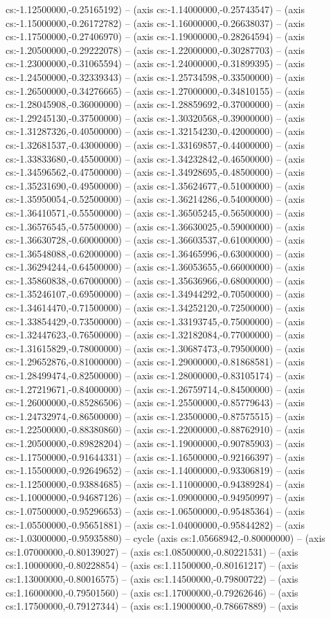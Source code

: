 cs:-1.12500000,-0.25165192) -- (axis cs:-1.14000000,-0.25743547) -- (axis cs:-1.15000000,-0.26172782) -- (axis cs:-1.16000000,-0.26638037) -- (axis cs:-1.17500000,-0.27406970) -- (axis cs:-1.19000000,-0.28264594) -- (axis cs:-1.20500000,-0.29222078) -- (axis cs:-1.22000000,-0.30287703) -- (axis cs:-1.23000000,-0.31065594) -- (axis cs:-1.24000000,-0.31899395) -- (axis cs:-1.24500000,-0.32339343) -- (axis cs:-1.25734598,-0.33500000) -- (axis cs:-1.26500000,-0.34276665) -- (axis cs:-1.27000000,-0.34810155) -- (axis cs:-1.28045908,-0.36000000) -- (axis cs:-1.28859692,-0.37000000) -- (axis cs:-1.29245130,-0.37500000) -- (axis cs:-1.30320568,-0.39000000) -- (axis cs:-1.31287326,-0.40500000) -- (axis cs:-1.32154230,-0.42000000) -- (axis cs:-1.32681537,-0.43000000) -- (axis cs:-1.33169857,-0.44000000) -- (axis cs:-1.33833680,-0.45500000) -- (axis cs:-1.34232842,-0.46500000) -- (axis cs:-1.34596562,-0.47500000) -- (axis cs:-1.34928695,-0.48500000) -- (axis cs:-1.35231690,-0.49500000) -- (axis cs:-1.35624677,-0.51000000) -- (axis cs:-1.35950054,-0.52500000) -- (axis cs:-1.36214286,-0.54000000) -- (axis cs:-1.36410571,-0.55500000) -- (axis cs:-1.36505245,-0.56500000) -- (axis cs:-1.36576545,-0.57500000) -- (axis cs:-1.36630025,-0.59000000) -- (axis cs:-1.36630728,-0.60000000) -- (axis cs:-1.36603537,-0.61000000) -- (axis cs:-1.36548088,-0.62000000) -- (axis cs:-1.36465996,-0.63000000) -- (axis cs:-1.36294244,-0.64500000) -- (axis cs:-1.36053655,-0.66000000) -- (axis cs:-1.35860838,-0.67000000) -- (axis cs:-1.35636966,-0.68000000) -- (axis cs:-1.35246107,-0.69500000) -- (axis cs:-1.34944292,-0.70500000) -- (axis cs:-1.34614470,-0.71500000) -- (axis cs:-1.34252120,-0.72500000) -- (axis cs:-1.33854429,-0.73500000) -- (axis cs:-1.33193745,-0.75000000) -- (axis cs:-1.32447623,-0.76500000) -- (axis cs:-1.32182084,-0.77000000) -- (axis cs:-1.31615829,-0.78000000) -- (axis cs:-1.30687473,-0.79500000) -- (axis cs:-1.29652876,-0.81000000) -- (axis cs:-1.29000000,-0.81868581) -- (axis cs:-1.28499474,-0.82500000) -- (axis cs:-1.28000000,-0.83105174) -- (axis cs:-1.27219671,-0.84000000) -- (axis cs:-1.26759714,-0.84500000) -- (axis cs:-1.26000000,-0.85286506) -- (axis cs:-1.25500000,-0.85779643) -- (axis cs:-1.24732974,-0.86500000) -- (axis cs:-1.23500000,-0.87575515) -- (axis cs:-1.22500000,-0.88380860) -- (axis cs:-1.22000000,-0.88762910) -- (axis cs:-1.20500000,-0.89828204) -- (axis cs:-1.19000000,-0.90785903) -- (axis cs:-1.17500000,-0.91644331) -- (axis cs:-1.16500000,-0.92166397) -- (axis cs:-1.15500000,-0.92649652) -- (axis cs:-1.14000000,-0.93306819) -- (axis cs:-1.12500000,-0.93884685) -- (axis cs:-1.11000000,-0.94389284) -- (axis cs:-1.10000000,-0.94687126) -- (axis cs:-1.09000000,-0.94950997) -- (axis cs:-1.07500000,-0.95296653) -- (axis cs:-1.06500000,-0.95485364) -- (axis cs:-1.05500000,-0.95651881) -- (axis cs:-1.04000000,-0.95844282) -- (axis cs:-1.03000000,-0.95935880) -- cycle (axis cs:1.05668942,-0.80000000) -- (axis cs:1.07000000,-0.80139027) -- (axis cs:1.08500000,-0.80221531) -- (axis cs:1.10000000,-0.80228854) -- (axis cs:1.11500000,-0.80161217) -- (axis cs:1.13000000,-0.80016575) -- (axis cs:1.14500000,-0.79800722) -- (axis cs:1.16000000,-0.79501560) -- (axis cs:1.17000000,-0.79262646) -- (axis cs:1.17500000,-0.79127344) -- (axis cs:1.19000000,-0.78667889) -- (axis 